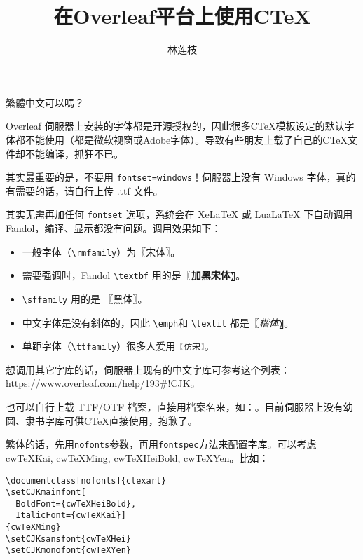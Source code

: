 \documentclass[11pt]{ctexart}
\title{在Overleaf平台上使用C\TeX}
\author{林莲枝}
\begin{document}
\maketitle

繁體中文可以嗎？

Overleaf 伺服器上安装的字体都是开源授权的，因此很多C\TeX{}模板设定的默认字体都不能使用（都是微软视窗或Adobe字体）。导致有些朋友上载了自己的C\TeX{}文件却不能编译，抓狂不已。

其实最重要的是，不要用 \verb|fontset=windows|！伺服器上没有 Windows 字体，真的有需要的话，请自行上传 .ttf 文件。

其实无需再加任何 \verb|fontset| 选项，系统会在 XeLaTeX 或 LuaLaTeX 下自动调用 Fandol，编译、显示都没有问题。调用效果如下：

\begin{itemize}
\item 一般字体（\verb|\rmfamily|）为〖宋体〗。
\item 需要强调时，Fandol \verb|\textbf| 用的是〖\textbf{加黑宋体}〗。
\item \verb|\sffamily| 用的是 〖\textsf{黑体}〗。
\item 中文字体是没有斜体的，因此 \verb|\emph|和 \verb|\textit| 都是〖\textit{楷体}〗。

\item 单距字体（\verb|\ttfamily|）很多人爱用\texttt{〖仿宋〗}。

\end{itemize}


想调用其它字库的话，伺服器上现有的中文字库可参考这个列表：\url{https://www.overleaf.com/help/193#!CJK}。

也可以自行上载 TTF/OTF 档案，直接用档案名来，如：\texttt{\setmainfont{shuti.otf}}。目前伺服器上没有幼圆、隶书字库可供C\TeX{}直接使用，抱歉了。


繁体的话，先用\verb|nofonts|参数，再用\verb|fontspec|方法来配置字库。可以考虑 cwTeXKai, cwTeXMing, cwTeXHeiBold, cwTeXYen。比如：

\begin{verbatim}
\documentclass[nofonts]{ctexart}
\setCJKmainfont[
  BoldFont={cwTeXHeiBold},
  ItalicFont={cwTeXKai}]
{cwTeXMing}
\setCJKsansfont{cwTeXHei}
\setCJKmonofont{cwTeXYen}
\end{verbatim}
\end{document}
